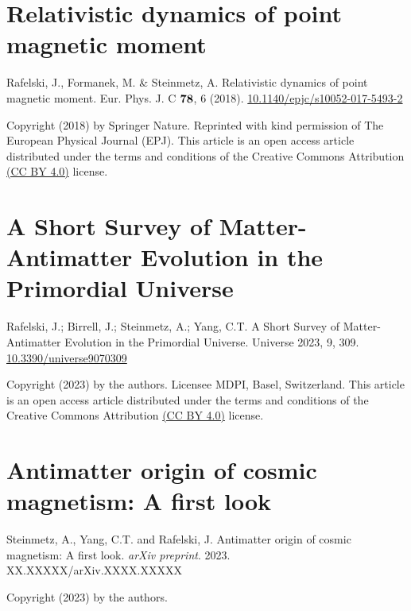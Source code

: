 

\chapter{Relativistic dynamics of point magnetic moment}
\label{appendixC}
\begin{center}
Rafelski, J., Formanek, M. \& Steinmetz, A. Relativistic dynamics of point magnetic moment. Eur. Phys. J. C $\boldsymbol{78}$, 6 (2018). \href{https://doi.org/10.1140/epjc/s10052-017-5493-2}{10.1140/epjc/s10052-017-5493-2}
\end{center}

\noindent Copyright (2018) by Springer Nature. Reprinted with kind permission of The European Physical Journal (EPJ). This article is an open access article distributed under the terms and conditions of the Creative Commons Attribution \href{https://creativecommons.org/licenses/by/4.0/}{(CC BY 4.0)} license.



\chapter{A Short Survey of Matter-Antimatter Evolution in the Primordial Universe}
\label{appendixD}
\begin{center}
Rafelski, J.; Birrell, J.; Steinmetz, A.; Yang, C.T. A Short Survey of Matter-Antimatter Evolution in the Primordial Universe. Universe 2023, 9, 309. \href{https://doi.org/10.3390/universe9070309}{10.3390/universe9070309}
\end{center}

\noindent Copyright (2023) by the authors. Licensee MDPI, Basel, Switzerland. This article is an open access article distributed under the terms and conditions of the Creative Commons Attribution \href{https://creativecommons.org/licenses/by/4.0/}{(CC BY 4.0)} license.



\chapter{Antimatter origin of cosmic magnetism: A first look}
\label{appendixE}
\begin{center}
Steinmetz, A., Yang, C.T. and Rafelski, J. Antimatter origin of cosmic magnetism: A first look. \emph{arXiv preprint}. 2023. XX.XXXXX/arXiv.XXXX.XXXXX
\end{center}

\noindent Copyright (2023) by the authors.

%
